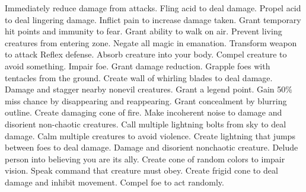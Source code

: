     {Immediately reduce damage from attacks.}
    {Fling acid to deal damage.}
    {Propel acid to deal lingering damage.}
    {Inflict pain to increase damage taken.}
    {Grant temporary hit points and immunity to fear.}
    {Grant ability to walk on air.}
    {Prevent living creatures from entering zone.}
    {Negate all magic in emanation.}
    {Transform weapon to attack Reflex defense.}
    {Absorb creature into your body.}
    {Compel creature to avoid something.}
    {Impair foe.}
    {Grant damage reduction.}
    {Grapple foes with tentacles from the ground.}
    {Create wall of whirling blades to deal damage.}
    {Damage and stagger nearby nonevil creatures.}
    {Grant a legend point.}
    {Gain 50\% miss chance by disappearing and reappearing.}
    {Grant concealment by blurring outline.}
    {Create damaging cone of fire.}
    {Make incoherent noise to damage and disorient non-chaotic creatures.}
    {Call multiple lightning bolts from sky to deal damage.}
    {Calm multiple creatures to avoid violence.}
    {Create lightning that jumps between foes to deal damage.}
    {Damage and disorient nonchaotic creature.}
    {Delude person into believing you are its ally.}
    {Create cone of random colors to impair vision.}
    {Speak command that creature must obey.}
    {Create frigid cone to deal damage and inhibit movement.}
    {Compel foe to act randomly.}
